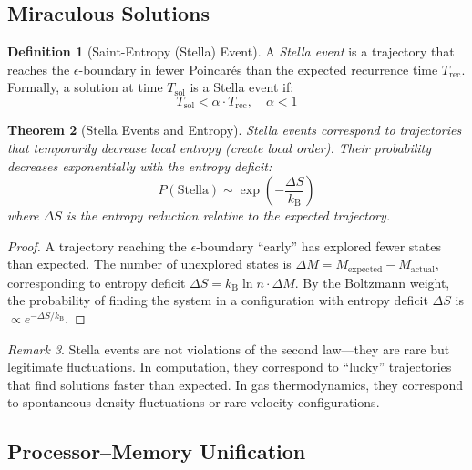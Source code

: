 \documentclass[twocolumn,10pt,a4paper]{article}
\theoremstyle{plain}
\newtheorem{theorem}{Theorem}[section]
\theoremstyle{definition}
\newtheorem{definition}[theorem]{Definition}
\theoremstyle{remark}
\newtheorem{remark}[theorem]{Remark}
\newcommand{\kB}{k_{\mathrm{B}}}
\begin{document}
\subsection{Miraculous Solutions}

\begin{definition}[Saint-Entropy (Stella) Event]
\label{def:stella}
A \emph{Stella event} is a trajectory that reaches the $\epsilon$-boundary in fewer Poincar\'{e}s than the expected recurrence time $T_{\mathrm{rec}}$. Formally, a solution at time $T_{\mathrm{sol}}$ is a Stella event if:
\begin{equation}
    T_{\mathrm{sol}} < \alpha \cdot T_{\mathrm{rec}}, \quad \alpha < 1
\end{equation}
\end{definition}

\begin{theorem}[Stella Events and Entropy]
\label{thm:stella}
Stella events correspond to trajectories that temporarily decrease local entropy (create local order). Their probability decreases exponentially with the entropy deficit:
\begin{equation}
    P(\text{Stella}) \sim \exp\!\left(-\frac{\Delta S}{\kB}\right)
\end{equation}
where $\Delta S$ is the entropy reduction relative to the expected trajectory.
\end{theorem}

\begin{proof}
A trajectory reaching the $\epsilon$-boundary ``early'' has explored fewer states than expected. The number of unexplored states is $\Delta M = M_{\mathrm{expected}} - M_{\mathrm{actual}}$, corresponding to entropy deficit $\Delta S = \kB \ln n \cdot \Delta M$. By the Boltzmann weight, the probability of finding the system in a configuration with entropy deficit $\Delta S$ is $\propto e^{-\Delta S/\kB}$.
\end{proof}

\begin{remark}
Stella events are not violations of the second law---they are rare but legitimate fluctuations. In computation, they correspond to ``lucky'' trajectories that find solutions faster than expected. In gas thermodynamics, they correspond to spontaneous density fluctuations or rare velocity configurations.
\end{remark}

\subsection{Processor--Memory Unification}
\end{document}
